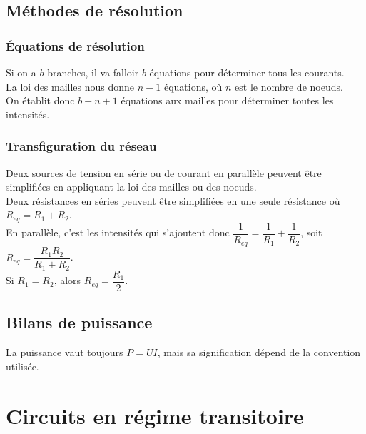 \documentclass[13pt, twoside, a4paper, french]{report}
\begin{document}
        
        \section{Méthodes de résolution}\label{sec:methodes-de-resolution}
            
            \subsection{Équations de résolution}\label{subsec:equations-de-resolution}
                
                Si on a $b$ branches, il va falloir $b$ équations pour déterminer tous les courants.\\
                La loi des mailles nous donne $n-1$ équations, où $n$ est le nombre de noeuds.\\
                On établit donc $b - n + 1$ équations aux mailles pour déterminer toutes les intensités.
            
            \subsection{Transfiguration du réseau}\label{subsec:transfiguration-du-reseau}
                
                Deux sources de tension en série ou de courant en parallèle peuvent être simplifiées en appliquant la loi des mailles ou des noeuds.\\
                
                Deux résistances en séries peuvent être simplifiées en une seule résistance où $R_{eq} = R_1 + R_2$.\\
                En parallèle, c'est les intensités qui s'ajoutent donc $\dfrac{1}{R_{eq}} = \dfrac{1}{R_1} + \dfrac{1}{R_2}$, soit $R_{eq} = \dfrac{R_1 R_2}{R_1 + R_2}$.\\
                Si $R_1 = R_2$, alors $R_{eq} = \dfrac{R_1}{2}$.\\
        
        
        \section{Bilans de puissance}\label{sec:bilans-de-puissance}
            
            La puissance vaut toujours $P = UI$, mais sa signification dépend de la convention utilisée.
    
    
    \chapter{Circuits en régime transitoire}\label{ch:circuits-en-regime-transitoire}
        
\end{document}
